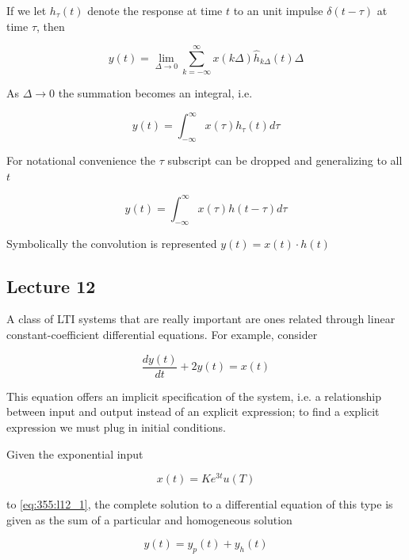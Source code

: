 \documentclass[../notes.tex]{subfiles}
\begin{document}
If we let $ h_\tau (t) $ denote the response at time $ t $ to an unit impulse $ \delta(t - \tau) $ at time $ \tau $, then


\begin{equation}
	y(t) = \lim_{\Delta \to 0} \sum_{k=-\infty}^{\infty} x(k\Delta) \hat{h}_{k\Delta} (t) \Delta
\end{equation}

As $ \Delta \to 0 $ the summation becomes an integral, i.e.

\begin{equation}
	y(t) = \int_{-\infty}^{\infty}   x(\tau) h_{\tau}  (t) d \tau
\end{equation}

For notational convenience the $ \tau $ subscript can be dropped and generalizing to all $ t $ 

\begin{equation}
	y(t) = \int_{-\infty}^{\infty}   x(\tau) h(t-\tau) d \tau
\end{equation}

Symbolically the convolution is represented $ y(t) = x(t) \cdot h(t)$ 


\subsection{Lecture 12}
A class of LTI systems that are really important are ones related through linear constant-coefficient differential equations.
For example, consider

\begin{equation}
	\frac{dy(t)}{dt} + 2 y(t) = x(t)
	\label{eq:355:l12_1}
\end{equation}

This equation offers an implicit specification of the system, i.e. a relationship between input and output instead of an explicit expression; to find a explicit expression we must plug in initial conditions.


Given the exponential input 

\begin{equation}
	x(t) = K e^{3t} u(T)
\end{equation}

to  \eqref{eq:355:l12_1}, the complete solution to a differential equation of this type is given as the sum of a particular and homogeneous solution

\begin{equation}
	y(t) = y_p(t) + y_h(t)
\end{equation}
\end{document}
